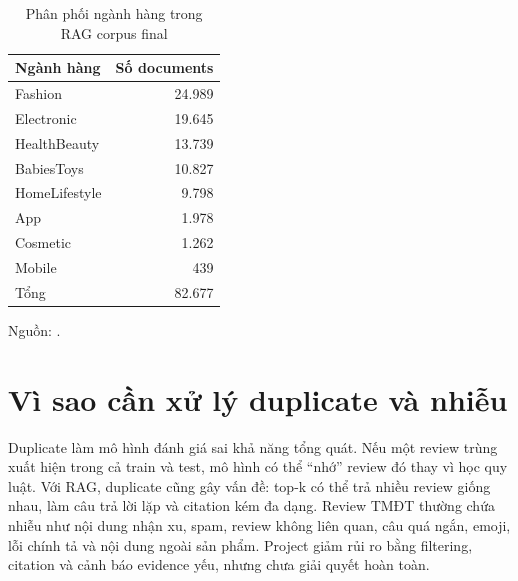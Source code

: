 \begin{table}[H]
\centering
\caption[Phân phối ngành hàng trong RAG corpus final]{Phân phối ngành hàng trong RAG corpus final}
\label{tab:rag-category-final}
\begin{tabular}{lr}
\toprule
Ngành hàng & Số documents \\
\midrule
Fashion & 24.989 \\
Electronic & 19.645 \\
HealthBeauty & 13.739 \\
BabiesToys & 10.827 \\
HomeLifestyle & 9.798 \\
App & 1.978 \\
Cosmetic & 1.262 \\
Mobile & 439 \\
\midrule
Tổng & 82.677 \\
\bottomrule
\end{tabular}
\par\vspace{0.25em}
{\footnotesize Nguồn: .}
\end{table}


\section{Vì sao cần xử lý duplicate và nhiễu}
Duplicate làm mô hình đánh giá sai khả năng tổng quát. Nếu một review trùng xuất hiện trong cả train và test, mô hình có thể “nhớ” review đó thay vì học quy luật. Với RAG, duplicate cũng gây vấn đề: top-k có thể trả nhiều review giống nhau, làm câu trả lời lặp và citation kém đa dạng. Review TMĐT thường chứa nhiễu như nội dung nhận xu, spam, review không liên quan, câu quá ngắn, emoji, lỗi chính tả và nội dung ngoài sản phẩm. Project giảm rủi ro bằng filtering, citation và cảnh báo evidence yếu, nhưng chưa giải quyết hoàn toàn.


